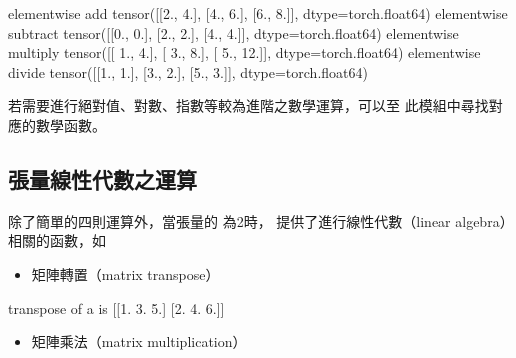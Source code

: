 \documentclass[letterpaper,10pt,english]{sphinxmanual}
\begin{document}
\begin{sphinxVerbatim}[commandchars=\\\{\}]
element\PYGZhy{}wise add 
 tensor([[2., 4.],
        [4., 6.],
        [6., 8.]], dtype=torch.float64)
element\PYGZhy{}wise subtract 
 tensor([[0., 0.],
        [2., 2.],
        [4., 4.]], dtype=torch.float64)
element\PYGZhy{}wise multiply 
 tensor([[ 1.,  4.],
        [ 3.,  8.],
        [ 5., 12.]], dtype=torch.float64)
element\PYGZhy{}wise divide 
 tensor([[1., 1.],
        [3., 2.],
        [5., 3.]], dtype=torch.float64)
\end{sphinxVerbatim}

若需要進行絕對值、對數、指數等較為進階之數學運算，可以至  此模組中尋找對應的數學函數。


\subsection{張量線性代數之運算}
\label{\detokenize{notebook/lab-torch-tensor:id11}}
除了簡單的四則運算外，當張量的  為2時， 提供了進行線性代數（linear algebra）相關的函數，如
\begin{itemize}
\item {} 
矩陣轉置（matrix transpose）

\end{itemize}

\begin{sphinxVerbatim}[commandchars=\\\{\}]
    
\end{sphinxVerbatim}

\begin{sphinxVerbatim}[commandchars=\\\{\}]
transpose of a is 
 [[1. 3. 5.]
 [2. 4. 6.]]
\end{sphinxVerbatim}
\begin{itemize}
\item {} 
矩陣乘法（matrix multiplication）

\end{itemize}
\end{document}
